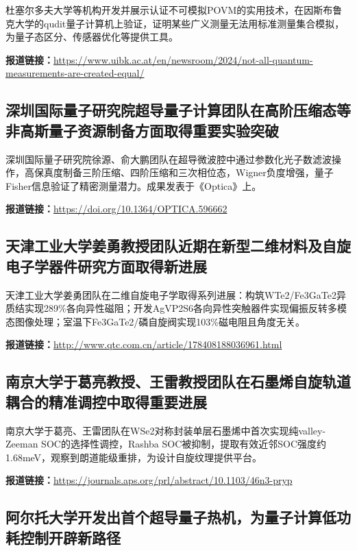 \documentclass[12pt,a4paper]{ctexart}
\begin{document}
杜塞尔多夫大学等机构开发并展示认证不可模拟POVM的实用技术，在因斯布鲁克大学的qudit量子计算机上验证，证明某些广义测量无法用标准测量集合模拟，为量子态区分、传感器优化等提供工具。

\noindent\textbf{报道链接：}\url{https://www.uibk.ac.at/en/newsroom/2024/not-all-quantum-measurements-are-created-equal/}

\subsection{ 深圳国际量子研究院超导量子计算团队在高阶压缩态等非高斯量子资源制备方面取得重要实验突破 }

深圳国际量子研究院徐源、俞大鹏团队在超导微波腔中通过参数化光子数滤波操作，高保真度制备三阶压缩、四阶压缩和三次相位态，Wigner负度增强，量子Fisher信息验证了精密测量潜力。成果发表于《Optica》上。

\noindent\textbf{报道链接：}\url{https://doi.org/10.1364/OPTICA.596662}

\subsection{ 天津工业大学姜勇教授团队近期在新型二维材料及自旋电子学器件研究方面取得新进展 }

天津工业大学姜勇团队在二维自旋电子学取得系列进展：构筑WTe2/Fe3GaTe2异质结实现289\%各向异性磁阻；开发AgVP2S6各向异性突触器件实现偏振反转多模态图像处理；室温下Fe3GaTe2/磷自旋阀实现103\%磁电阻且角度无关。

\noindent\textbf{报道链接：}\url{http://www.qtc.com.cn/article/178408188036961.html}

\subsection{ 南京大学于葛亮教授、王雷教授团队在石墨烯自旋轨道耦合的精准调控中取得重要进展 }

南京大学于葛亮、王雷团队在WSe2对称封装单层石墨烯中首次实现纯valley-Zeeman SOC的选择性调控，Rashba SOC被抑制，提取有效近邻SOC强度约1.68meV，观察到朗道能级重排，为设计自旋纹理提供平台。

\noindent\textbf{报道链接：}\url{https://journals.aps.org/prl/abstract/10.1103/46n3-pryp}

\subsection{ 阿尔托大学开发出首个超导量子热机，为量子计算低功耗控制开辟新路径 }
\end{document}
